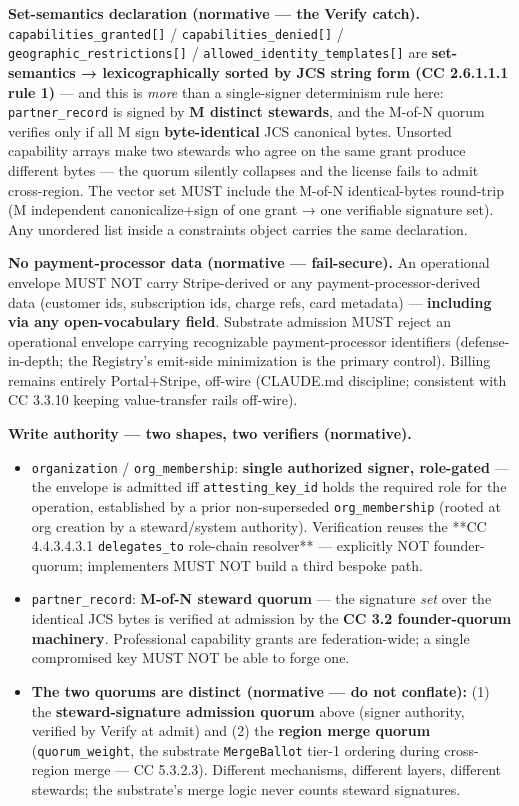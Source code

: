 \documentclass[11pt]{article}
\begin{document}
\textbf{Set-semantics declaration (normative — the Verify catch).} \texttt{capabilities\_granted[]} / \texttt{capabilities\_denied[]} / \texttt{geographic\_restrictions[]} / \texttt{allowed\_identity\_templates[]} are \textbf{set-semantics → lexicographically sorted by JCS string form (CC 2.6.1.1.1 rule 1)} — and this is \textit{more} than a single-signer determinism rule here: \texttt{partner\_record} is signed by \textbf{M distinct stewards}, and the M-of-N quorum verifies only if all M sign \textbf{byte-identical} JCS canonical bytes. Unsorted capability arrays make two stewards who agree on the same grant produce different bytes — the quorum silently collapses and the license fails to admit cross-region. The vector set MUST include the M-of-N identical-bytes round-trip (M independent canonicalize+sign of one grant → one verifiable signature set). Any unordered list inside a constraints object carries the same declaration.


\textbf{No payment-processor data (normative — fail-secure).} An operational envelope MUST NOT carry Stripe-derived or any payment-processor-derived data (customer ids, subscription ids, charge refs, card metadata) — \textbf{including via any open-vocabulary field}. Substrate admission MUST reject an operational envelope carrying recognizable payment-processor identifiers (defense-in-depth; the Registry's emit-side minimization is the primary control). Billing remains entirely Portal+Stripe, off-wire (CLAUDE.md discipline; consistent with CC 3.3.10 keeping value-transfer rails off-wire).


\textbf{Write authority — two shapes, two verifiers (normative).}

\begin{itemize}\setlength\itemsep{0pt}
\item \texttt{organization} / \texttt{org\_membership}: \textbf{single authorized signer, role-gated} — the envelope is admitted iff \texttt{attesting\_key\_id} holds the required role for the operation, established by a prior non-superseded \texttt{org\_membership} (rooted at org creation by a steward/system authority). Verification reuses the **CC 4.4.3.4.3.1 \texttt{delegates\_to} role-chain resolver** — explicitly NOT founder-quorum; implementers MUST NOT build a third bespoke path.
\item \texttt{partner\_record}: \textbf{M-of-N steward quorum} — the signature \textit{set} over the identical JCS bytes is verified at admission by the \textbf{CC 3.2 founder-quorum machinery}. Professional capability grants are federation-wide; a single compromised key MUST NOT be able to forge one.
\item \textbf{The two quorums are distinct (normative — do not conflate):} (1) the \textbf{steward-signature admission quorum} above (signer authority, verified by Verify at admit) and (2) the \textbf{region merge quorum} (\texttt{quorum\_weight}, the substrate \texttt{MergeBallot} tier-1 ordering during cross-region merge — CC 5.3.2.3). Different mechanisms, different layers, different stewards; the substrate's merge logic never counts steward signatures.
\end{itemize}
\end{document}

